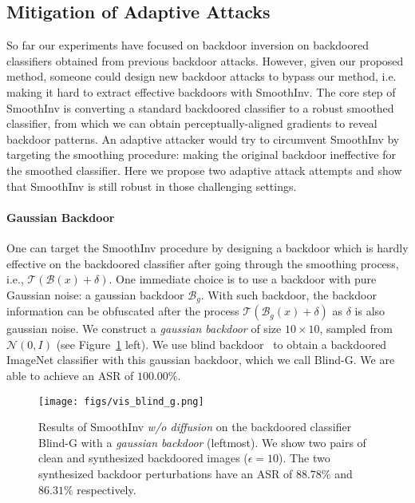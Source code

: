 \documentclass[10pt,twocolumn,letterpaper]{article}
\begin{document}
\subsection{Mitigation of Adaptive Attacks}
So far our experiments have focused on backdoor inversion on backdoored classifiers obtained from previous backdoor attacks. However, given our proposed method, someone could design new backdoor attacks to bypass our method, i.e. making it hard to extract effective backdoors with SmoothInv. The core step of SmoothInv is converting a standard backdoored classifier to a robust smoothed classifier, from which we can obtain perceptually-aligned gradients to reveal backdoor patterns. An adaptive attacker would try to circumvent SmoothInv by targeting the smoothing procedure: making the original backdoor ineffective for the smoothed classifier. Here we propose two adaptive attack attempts and show that SmoothInv is still robust in those challenging settings.




\paragraph{Gaussian Backdoor} 
One can target the SmoothInv procedure by designing a backdoor which is hardly effective on the backdoored classifier after going through the smoothing process, i.e., $\mathcal{T}(\mathcal{B}(x)+\delta)$. One immediate choice is to use a backdoor with pure Gaussian noise: a gaussian backdoor $\mathcal{B}_{g}$. With such backdoor, the backdoor information can be obfuscated after the process $\mathcal{T}(\mathcal{B}_{g}(x)+\delta)$ as $\delta$ is also gaussian noise. 
We construct a \textit{gaussian backdoor} of size $10\times 10$, sampled from $\mathcal{N}(0,I)$ (see Figure~\ref{fig:vis_exp_blind_g} left). We use blind backdoor~\cite{bagdasaryan2020blind} to obtain a  backdoored ImageNet classifier with this gaussian backdoor, which we call Blind-G. We are able to achieve an ASR of $100.00\%$. 

\begin{figure}[t!]
\centering 
        \texttt{[image: figs/vis\_blind\_g.png]}
    \caption{Results of SmoothInv \textit{w/o diffusion} on the backdoored classifier Blind-G with a \textit{gaussian backdoor} (leftmost). We show two pairs of clean and synthesized backdoored images ($\epsilon=10$). The two synthesized backdoor perturbations have an ASR of $88.78\%$ and $86.31\%$ respectively.}
    \label{fig:vis_exp_blind_g}
\end{figure}
\end{document}
